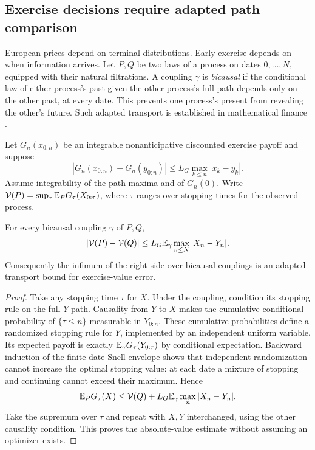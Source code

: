 \subsection{Exercise decisions require adapted path comparison}\label{sec:stopping}
European prices depend on terminal distributions. Early exercise depends on when information arrives. Let $P,Q$ be two laws of a process on dates $0,\ldots,N$, equipped with their natural filtrations. A coupling $\gamma$ is \emph{bicausal} if the conditional law of either process's past given the other process's full path depends only on the other past, at every date. This prevents one process's present from revealing the other's future. Such adapted transport is established in mathematical finance \citep{backhoff2020,backhoff2022}.

Let $G_n(x_{0:n})$ be an integrable nonanticipative discounted exercise payoff and suppose
\[
 |G_n(x_{0:n})-G_n(y_{0:n})|
 \le L_G\max_{k\le n}|x_k-y_k|.
\]
Assume integrability of the path maxima and of $G_n(0)$. Write
$\mathcal V(P)=\sup_\tau\mathbb E_PG_\tau(X_{0:\tau})$,
where $\tau$ ranges over stopping times for the observed process.

\begin{theorem}\label{thm:stopping}
For every bicausal coupling $\gamma$ of $P,Q$,
\begin{equation}\label{eq:stopping-stability}
 |\mathcal V(P)-\mathcal V(Q)|
 \le L_G\mathbb E_\gamma\max_{n\le N}|X_n-Y_n|.
\end{equation}
Consequently the infimum of the right side over bicausal couplings is an adapted transport bound for exercise-value error.
\end{theorem}
\begin{proof}
Take any stopping time $\tau$ for $X$. Under the coupling, condition its stopping rule on the full $Y$ path. Causality from $Y$ to $X$ makes the cumulative conditional probability of $\{\tau\le n\}$ measurable in $Y_{0:n}$. These cumulative probabilities define a randomized stopping rule for $Y$, implemented by an independent uniform variable. Its expected payoff is exactly $\mathbb E_\gamma G_\tau(Y_{0:\tau})$ by conditional expectation. Backward induction of the finite-date Snell envelope shows that independent randomization cannot increase the optimal stopping value: at each date a mixture of stopping and continuing cannot exceed their maximum. Hence
\[
 \mathbb E_PG_\tau(X)\le\mathcal V(Q)
       +L_G\mathbb E_\gamma\max_n|X_n-Y_n|.
\]
Take the supremum over $\tau$ and repeat with $X,Y$ interchanged, using the other causality condition. This proves the absolute-value estimate without assuming an optimizer exists.
\end{proof}

